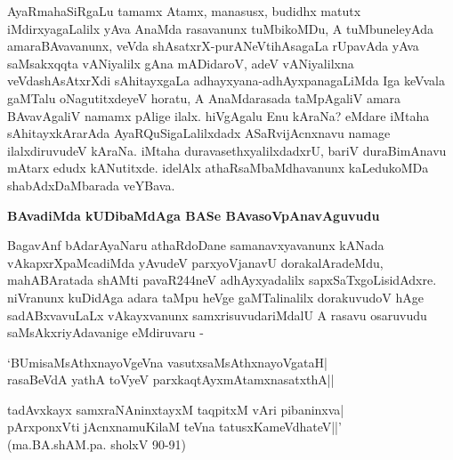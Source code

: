 AyaRmahaSiRgaLu tamamx Atamx, manasusx, budidhx matutx iMdirxyagaLalilx yAva AnaMda rasa\-vanunx tuMbikoMDu, A tuMbuneleyAda amaraBAvavanunx, veVda shAsatxrX-purANeVtihAsagaLa rUpa\-vAda yAva saMsakxqqta vANiyalilx gAna mADi\-daroV, adeV vANiyalilxna veVdashAsAtxrXdi sAhitayxgaLa adhayx\-yana-\-adhAyxpanagaLiMda Iga keVvala gaMTalu oNagutitxdeyeV horatu, A AnaMdarasada taMpA\-galiV amara BAvavAgaliV namamx pAlige ilalx. hiVgAgalu Enu kAraNa? eMdare iMtaha sAhitayx\-kAra\-rAda AyaR\-QuSi\-gaLa\-lilxdadx ASaRvijAcnxnavu namage ilalxdiruvudeV kAraNa. iMtaha duravasethxyalilxdadxrU, bariV duraBi\-mAnavu mAtarx edudx kANutitxde. idelAlx athaRsaMbaMdhavanunx kaLedukoMDa shabAdxDaMbarada veYBava.

{\bigskip
\noindent
{\large\bf BAvadiMda kUDibaMdAga BASe BAvasoVpAnavAguvudu}}\label{page26}
\medskip

\noindent
BagavAnf bAdarAyaNaru athaRdoDane samanavxyavanunx kANada vAkapxrXpaMcadiMda yAvudeV parx\-yoVjanavU dorakalAradeMdu, mahABAratada shAMti pavaR\break 244neV adhAyxyadalilx sapxSaTx\-goLisi\-dAdxre. niVranunx kuDidAga adara taMpu heVge gaMTalinalilx dorakuvudoV hAge sadABxvavuLaLx vAkayxvanunx samxrisu\-vuda\-riMdalU A rasavu osaruvudu saMsAkxriyAdavanige eMdiruvaru -

\medskip
\begin{shloka}
`BUmisaMsAthxnayoVgeVna vasutxsaMsAthxnayoVgataH|\\\label{26}
rasaBeVdA yathA toVyeV parxkaqtAyxmAtamxnasatxthA||\\
\end{shloka}

\begin{shloka}
tadAvxkayx samxraNAninxtayxM taqpitxM vAri pibaninxva|\\
pArxponxVti jAcnxnamuKilaM teVna tatusxKameVdhateV||'\\
\hfill(ma.BA.shAM.pa. sholxV 90-91)
\end{shloka}

